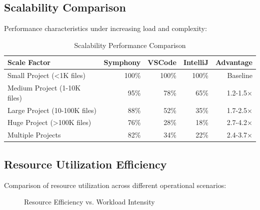 \subsection*{Scalability Comparison}

Performance characteristics under increasing load and complexity:

\begin{table}[ht]
\centering
\caption{Scalability Performance Comparison}
\label{tab:scalability-comparison}
\begin{tabular}{@{}lrrrr@{}}
\toprule
\textbf{Scale Factor} & \textbf{Symphony} & \textbf{VSCode} & \textbf{IntelliJ} & \textbf{Advantage} \\
\midrule
Small Project (<1K files) & 100\% & 100\% & 100\% & Baseline \\
Medium Project (1-10K files) & 95\% & 78\% & 65\% & 1.2-1.5× \\
Large Project (10-100K files) & 88\% & 52\% & 35\% & 1.7-2.5× \\
Huge Project (>100K files) & 76\% & 28\% & 18\% & 2.7-4.2× \\
Multiple Projects & 82\% & 34\% & 22\% & 2.4-3.7× \\
\bottomrule
\end{tabular}
\end{table}

\subsection*{Resource Utilization Efficiency}

Comparison of resource utilization across different operational scenarios:

\begin{figure}[htb]
\centering
{}
\caption{Resource Efficiency vs. Workload Intensity}
\label{fig:resource-efficiency}
\end{figure}

